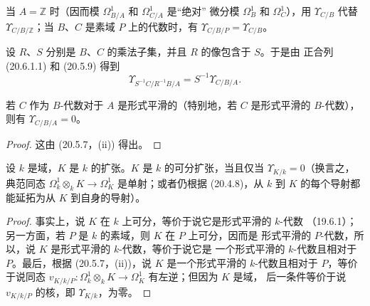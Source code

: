 当 $A=\mathbb{Z}$ 时（因而模 $\Omega^1_{B/A}$ 和 $\Omega^1_{C/A}$ 是“绝对”
微分模 $\Omega^1_B$ 和 $\Omega^1_C$），用 $\Upsilon_{C/B}$ 代替
$\Upsilon_{C/B/\mathbb{Z}}$；当 $B$、$C$ 是素域 $P$ 上的代数时，有
$\Upsilon_{C/B/P}=\Upsilon_{C/B}$。

设 $R$、$S$ 分别是 $B$、$C$ 的乘法子集，并且 $R$ 的像包含于 $S$。于是由
正合列 (20.6.1.1) 和 (20.5.9) 得到
\begin{equation}
\tag{20.6.1.2}
\label{0.20.6.1.2-fr}
  \Upsilon_{S^{-1}C/R^{-1}B/A}=S^{-1}\Upsilon_{C/B/A}.
\end{equation}

\begin{proposition}[20.6.2]
\label{0.20.6.2-fr}
若 $C$ 作为 $B$-代数对于 $A$ 是形式平滑的（特别地，若 $C$ 是形式平滑的
$B$-代数），则有 $\Upsilon_{C/B/A}=0$。
\end{proposition}

\begin{proof}
这由 (20.5.7，(ii)) 得出。
\end{proof}

\begin{proposition}[20.6.3]
\label{0.20.6.3-fr}
设 $k$ 是域，$K$ 是 $k$ 的扩张。$K$ 是 $k$ 的可分扩张，当且仅当
$\Upsilon_{K/k}=0$（换言之，典范同态
$\Omega^1_k\otimes_k K\to\Omega^1_K$ 是单射；或者仍根据 (20.4.8)，从 $k$
到 $K$ 的每个导射都能延拓为从 $K$ 到自身的导射）。
\end{proposition}

\begin{proof}
事实上，说 $K$ 在 $k$ 上可分，等价于说它是形式平滑的 $k$-代数
（19.6.1）；另一方面，若 $P$ 是 $k$ 的素域，则 $K$ 在 $P$ 上可分，因而是
形式平滑的 $P$-代数，所以，说 $K$ 是形式平滑的 $k$-代数，等价于说它是
一个形式平滑的 $k$-代数且相对于 $P$。最后，根据 (20.5.7，(ii))，说 $K$
是一个形式平滑的 $k$-代数且相对于 $P$，等价于说同态
$v_{K/k/P}:\Omega^1_k\otimes_k K\to\Omega^1_K$ 有左逆；但因为 $K$ 是域，
后一条件等价于说 $v_{K/k/P}$ 的核，即 $\Upsilon_{K/k}$，为零。
\end{proof}

